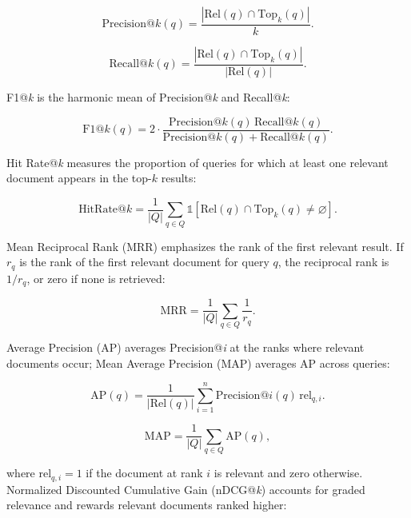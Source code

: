 \begin{equation}
\mathrm{Precision@}k(q) =
\frac{|\mathrm{Rel}(q) \cap \mathrm{Top}_k(q)|}{k}.
\end{equation}

\begin{equation}
\mathrm{Recall@}k(q) =
\frac{|\mathrm{Rel}(q) \cap \mathrm{Top}_k(q)|}
{|\mathrm{Rel}(q)|}.
\end{equation}

F1@\emph{k} is the harmonic mean of Precision@\emph{k} and Recall@\emph{k}:

\begin{equation}
\mathrm{F1@}k(q) =
2 \cdot \frac{\mathrm{Precision@}k(q)\,\mathrm{Recall@}k(q)}
{\mathrm{Precision@}k(q) + \mathrm{Recall@}k(q)}.
\end{equation}

Hit Rate@\emph{k} measures the proportion of queries for which at least
one relevant document appears in the top-$k$ results:

\begin{equation}
\mathrm{HitRate@}k = \frac{1}{|Q|}
\sum_{q \in Q} \mathbb{1}
\left[\mathrm{Rel}(q) \cap \mathrm{Top}_k(q) \ne \varnothing\right].
\end{equation}

Mean Reciprocal Rank (MRR) emphasizes the rank of the first relevant
result. If $r_q$ is the rank of the first relevant document for query
$q$, the reciprocal rank is $1/r_q$, or zero if none is retrieved:

\begin{equation}
\mathrm{MRR} = \frac{1}{|Q|}
\sum_{q \in Q} \frac{1}{r_q}.
\end{equation}

Average Precision (AP) averages Precision@\emph{i} at the ranks where
relevant documents occur; Mean Average Precision (MAP) averages AP across
queries:

\begin{equation}
\mathrm{AP}(q) = \frac{1}{|\mathrm{Rel}(q)|}
\sum_{i=1}^{n} \mathrm{Precision@}i(q)\,\mathrm{rel}_{q,i}.
\end{equation}

\begin{equation}
\mathrm{MAP} = \frac{1}{|Q|}\sum_{q\in Q}\mathrm{AP}(q),
\end{equation}

where $\mathrm{rel}_{q,i}=1$ if the document at rank $i$ is relevant and
zero otherwise. Normalized Discounted Cumulative Gain (nDCG@\emph{k})
accounts for graded relevance and rewards relevant documents ranked
higher:

